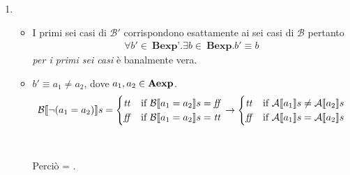 {\begin{enumerate}[label=(\alph*)]
   =
  \caseFun{\semtrue}
          {( = \semtrue \mbox{ and }  = \semtrue)
           \mbox{ or }
           ( = \semfalse \mbox{ and }  = \semfalse)}
          {\semfalse}
          {( = \semtrue \mbox{ or }  = \semfalse)
           \mbox{ and }
           ( = \semfalse \mbox{ or }  = \semtrue)}
          \\ \\

\item
  \begin{itemize}
    \item I primi sei casi di $\mathcal{B'}$ corrispondono esattamente ai sei
casi di $\mathcal{B}$ pertanto
      \begin{align*}
        \forall b' \in \ \textbf{Bexp'}.\exists b \in 
        \ \textbf{Bexp}.b' \equiv b
      \end{align*}
      \textit{per i primi sei casi} è banalmente vera.

    \item $b' \equiv a_1 \neq a_2$, dove $a_1, a_2 \in \mbox{\textbf{Aexp}}$. \\ 
      \begin{align*}
        \mathcal{B} \llbracket \lnot (a_1 = a_2) \rrbracket s =
        \begin{cases}
          \mbox{\textit{tt}} &
          \mbox{if} \ \mathcal{B} \llbracket a_1 = a_2 \rrbracket s = \mbox{\textit{ff}} \\
          \mbox{\textit{ff}} &
          \mbox{if} \ \mathcal{B} \llbracket a_1 = a_2 \rrbracket s = \mbox{\textit{tt}} \\
        \end{cases}
        \rightarrow
        \begin{cases}
          \mbox{\textit{tt}} &
          \mbox{if} \ \mathcal{A} \llbracket a_1 \rrbracket s \neq  \mathcal{A} \llbracket a_2 \rrbracket s \\
          \mbox{\textit{ff}} &
          \mbox{if} \ \mathcal{A} \llbracket a_1 \rrbracket s = \mathcal{A} \llbracket a_2 \rrbracket s \\
        \end{cases}
      \end{align*} \\ \\
      Perciò  = . \\


\end{itemize}
\end{enumerate}}
